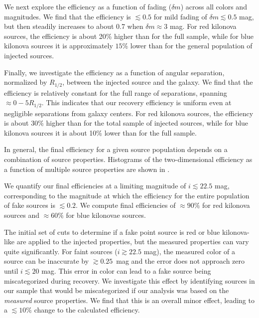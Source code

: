 We next explore the efficiency as a function of fading ($\delta m$) across all colors and magnitudes. We find that the efficiency is $\lesssim 0.5$ for mild fading of $\delta m\lesssim 0.5$ mag, but then steadily increases to about 0.7 when $\delta m\approx 3$ mag. For red kilonova sources, the efficiency is about 20\% higher than for the full sample, while for blue kilonova sources it is approximately $15$\% lower than for the general population of injected sources.

Finally, we investigate the efficiency as a function of angular separation, normalized by $R_{1/2}$, between the injected source and the galaxy. We find that the efficiency is relatively constant for the full range of separations, spanning $\approx 0-5 R_{1/2}$. This indicates that our recovery efficiency is uniform even at negligible separations from galaxy centers. For red kilonova sources, the efficiency is about 30\% higher than for the total sample of injected sources, while for blue kilonova sources it is about 10\% lower than for the full sample.

In general, the final efficiency for a given source population depends on a combination of source properties. Histograms of the two-dimensional efficiency as a function of multiple source properties are shown in .

We quantify our final efficiencies at a limiting magnitude of $i \lesssim 22.5$ mag, corresponding to the magnitude at which the efficiency for the entire population of fake sources is $\lesssim0.2$. We compute final efficiencies of $\approx90\%$ for red kilonova sources and $\approx60\%$ for blue kilonovae sources.

The initial set of cuts to determine if a fake point source is red or blue kilonova-like are applied to the injected properties, but the measured properties can vary quite significantly. For faint sources ($i \gtrsim 22.5$ mag), the measured color of a source can be inaccurate by $\gtrsim 0.25$~mag and the error does not approach zero until $i  \lesssim 20$ mag. This error in color can lead to a fake source being miscategorized during recovery. We investigate this effect by identifying sources in our sample that would be miscategorized if our analysis was based on the {\it measured} source properties. We find that this is an overall minor effect, leading to a $\lesssim 10 \%$ change to the calculated efficiency.

